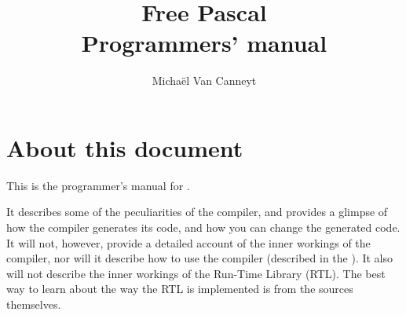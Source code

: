 %
%
%
%
%

%
%
\makeindex
{}
%
%

\title{Free Pascal \\ Programmers' manual}

\author{Micha\"el Van Canneyt}
\maketitle
\tableofcontents
\newpage
\listoftables
\newpage

\section*{About this document}
This is the programmer's manual for \fpc.

It describes some of the peculiarities of the \fpc compiler, and provides a
glimpse of how the compiler generates its code, and how you can change the
generated code. It will not, however, provide a detailed account of
the inner workings of the compiler, nor will it describe how to use the
compiler (described in the \userref). It also will not describe the inner
workings of the Run-Time Library (RTL). The best way to learn about the way
the RTL is implemented is from the sources themselves.

